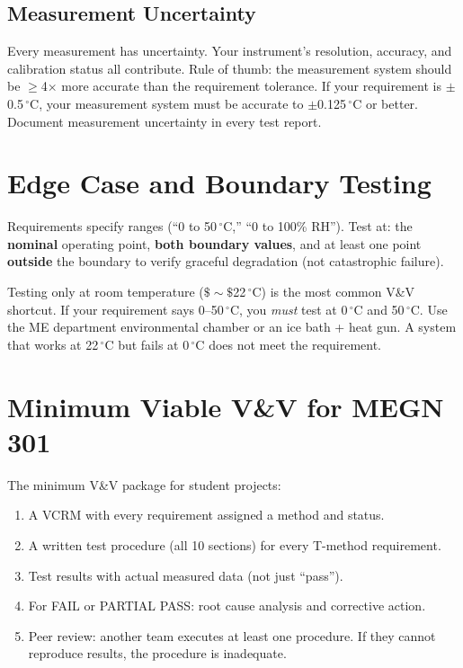 \documentclass[11pt,letterpaper,twoside,openany]{book}
\newcommand{\degC}{\ensuremath{{}^{\circ}\text{C}}}
\begin{document}
\subsection{Measurement Uncertainty}
Every measurement has uncertainty. Your instrument's resolution, accuracy, and calibration status all contribute. Rule of thumb: the measurement system should be $\geq$4$\times$ more accurate than the requirement tolerance. If your requirement is $\pm$0.5\,\degC{}, your measurement system must be accurate to $\pm$0.125\,\degC{} or better. Document measurement uncertainty in every test report.

\section{Edge Case and Boundary Testing}
Requirements specify ranges (``0 to 50\,\degC{},'' ``0 to 100\% RH''). Test at: the \textbf{nominal} operating point, \textbf{both boundary values}, and at least one point \textbf{outside} the boundary to verify graceful degradation (not catastrophic failure).

\begin{tipbox}
Testing only at room temperature ($\$\sim\$$22\,\degC{}) is the most common V\&V shortcut. If your requirement says 0--50\,\degC{}, you \emph{must} test at 0\,\degC{} and 50\,\degC{}. Use the ME department environmental chamber or an ice bath + heat gun. A system that works at 22\,\degC{} but fails at 0\,\degC{} does not meet the requirement.
\end{tipbox}

\section{Minimum Viable V\&V for MEGN 301}
The minimum V\&V package for student projects:
\begin{enumerate}[nosep,leftmargin=1.5em]
\item A VCRM with every requirement assigned a method and status.
\item A written test procedure (all 10 sections) for every T-method requirement.
\item Test results with actual measured data (not just ``pass'').
\item For FAIL or PARTIAL PASS: root cause analysis and corrective action.
\item Peer review: another team executes at least one procedure. If they cannot reproduce results, the procedure is inadequate.
\end{enumerate}
\end{document}
